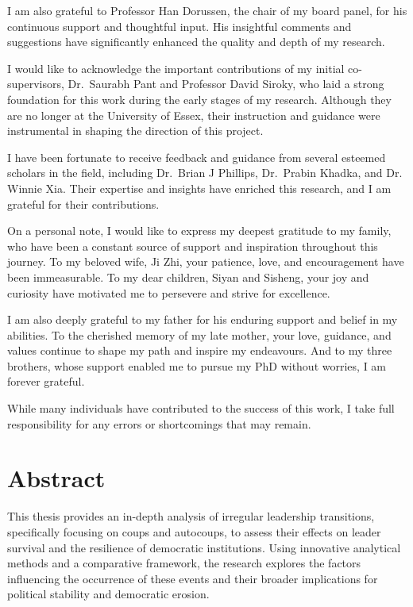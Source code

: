 \documentclass[
  12pt,
]{report}
\begin{document}
I am also grateful to Professor Han Dorussen, the chair of my board
panel, for his continuous support and thoughtful input. His insightful
comments and suggestions have significantly enhanced the quality and
depth of my research.

I would like to acknowledge the important contributions of my initial
co-supervisors, Dr.~Saurabh Pant and Professor David Siroky, who laid a
strong foundation for this work during the early stages of my research.
Although they are no longer at the University of Essex, their
instruction and guidance were instrumental in shaping the direction of
this project.

I have been fortunate to receive feedback and guidance from several
esteemed scholars in the field, including Dr.~Brian J Phillips,
Dr.~Prabin Khadka, and Dr. Winnie Xia. Their expertise and insights have
enriched this research, and I am grateful for their contributions.

On a personal note, I would like to express my deepest gratitude to my
family, who have been a constant source of support and inspiration
throughout this journey. To my beloved wife, Ji Zhi, your patience,
love, and encouragement have been immeasurable. To my dear children,
Siyan and Sisheng, your joy and curiosity have motivated me to persevere
and strive for excellence.

I am also deeply grateful to my father for his enduring support and
belief in my abilities. To the cherished memory of my late mother, your
love, guidance, and values continue to shape my path and inspire my
endeavours. And to my three brothers, whose support enabled me to pursue
my PhD without worries, I am forever grateful.

While many individuals have contributed to the success of this work, I
take full responsibility for any errors or shortcomings that may remain.

\chapter*{Abstract}\label{abstract}

This thesis provides an in-depth analysis of irregular leadership
transitions, specifically focusing on coups and autocoups, to assess
their effects on leader survival and the resilience of democratic
institutions. Using innovative analytical methods and a comparative
framework, the research explores the factors influencing the occurrence
of these events and their broader implications for political stability
and democratic erosion.
\end{document}
